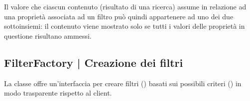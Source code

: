 \documentclass[10pt,a4paper,headinclude,footinclude,hidelinks]{scrreprt} %
\begin{document}
	Il valore che ciascun contenuto (risultato di una ricerca) assume in relazione ad una proprietà associata ad un filtro può quindi appartenere ad uno dei due sottoinsiemi: il contenuto viene mostrato solo se tutti i valori delle proprietà in questione risultano ammessi.

	\subsection[FilterFactory]{FilterFactory | Creazione dei filtri}
	\label{sec:stage:design:model.filter:filter-factory}
	La classe \textit{} offre un'interfaccia per creare filtri (\textit{}) basati sui possibili criteri (\textit{}) in modo trasparente rispetto al client.
\end{document}
